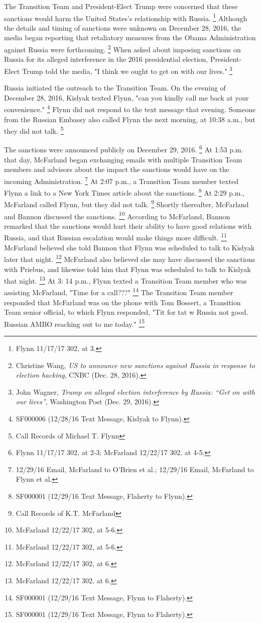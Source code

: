 The Transition Team and President-Elect Trump were concerned that these sanctions would harm the United States's relationship with Russia.%
\footnote{Flynn 11/17/17 302, at 3.}
Although the details and timing of sanctions were unknown on December 28, 2016, the media began reporting that retaliatory measures from the Obama Administration against Russia were forthcoming.%
\footnote{Christine Wang, \textit{US to announce new sanctions against Russia in response to election hacking}, CNBC (Dec. 28, 2016).}
When asked about imposing sanctions on Russia for its alleged interference in the 2016 presidential election, President-Elect Trump told the media, "I think we ought to get on with our lives."%
\footnote{John Wagner, \textit{Trump on alleged election interference by Russia: “Get on with our lives”}, Washington Post (Dec. 29, 2016).}

Russia initiated the outreach to the Transition Team.
On the evening of December 28, 2016, Kislyak texted Flynn, "can you kindly call me back at your convenience."%
\footnote{SF000006 (12/28/16 Text Message, Kislyak to Flynn).}
Flynn did not respond to the text message that evening.
Someone from the Russian Embassy also called Flynn the next morning, at 10:38 a.m., but they did not talk.%
\footnote{Call Records of Michael T. Flynn }

The sanctions were announced publicly on December 29, 2016.%
\footnote{Flynn 11/17/17 302, at 2-3;
McFarland 12/22/17 302, at 4-5.}
At 1:53 p.m. that day, McFarland began exchanging emails with multiple Transition Team members and advisors about the impact the sanctions would have on the incoming Administration.%
\footnote{12/29/16 Email, McFarland to O’Brien et al.;
12/29/16 Email, McFarland to Flynn et al.}
At 2:07 p.m., a Transition Team member texted Flynn a link to a New York Times article about the sanctions.%
\footnote{SF000001 (12/29/16 Text Message, Flaherty to Flynn).}
At 2:29 p.m., McFarland called Flynn, but they did not talk.%
\footnote{Call Records of K.T. McFarland }
Shortly thereafter, McFarland and Bannon discussed the sanctions.%
\footnote{McFarland 12/22/17 302, at 5-6.}
According to McFarland, Bannon remarked that the sanctions would hurt their ability to have good relations with Russia, and that Russian escalation would make things more difficult.%
\footnote{McFarland 12/22/17 302, at 5-6.}
McFarland believed she told Bannon that Flynn was scheduled to talk to Kislyak later that night.%
\footnote{McFarland 12/22/17 302, at 6.}
McFarland also believed she may have discussed the sanctions with Priebus, and likewise told him that Flynn was scheduled to talk to Kislyak that night.%
\footnote{McFarland 12/22/17 302, at 6.}
At 3: 14 p.m., Flynn texted a Transition Team member who was assisting McFarland, "Time for a call???"%
\footnote{SF000001 (12/29/16 Text Message, Flynn to Flaherty).}
The Transition Team member responded that McFarland was on the phone with Tom Bossert, a Transition Team senior official, to which Flynn responded, "Tit for tat w Russia not good.
Russian AMBO reaching out to me today."%
\footnote{SF000001 (12/29/16 Text Message, Flynn to Flaherty).}

